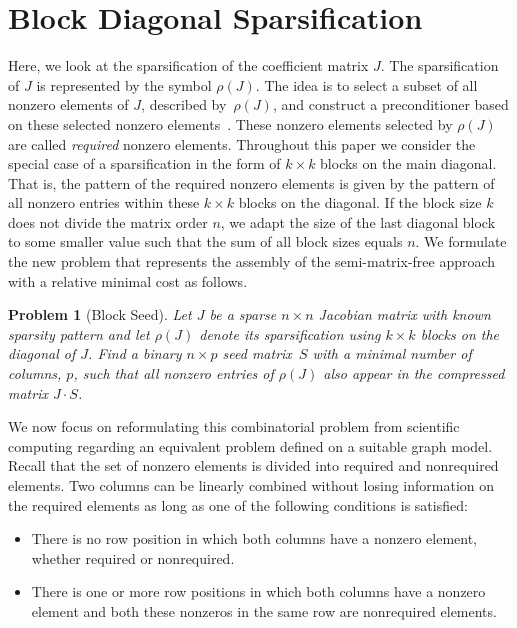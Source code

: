 \documentclass[11pt, twoside,a4paper]{book}
\newtheorem{problem}{Problem}
\newcommand{\sparsifysymbol}{\ensuremath{\rho}}
\newcommand{\sparsify}[1]{\ensuremath{\sparsifysymbol(#1)}}
\begin{document}
\section{Block Diagonal Sparsification}
\label{s.block.diag.sp}
Here, we look at the sparsification of the coefficient matrix $J$. The
sparsification of $J$ is represented by the symbol \sparsify{J}. The idea is to select a
subset of all nonzero elements of $J$, described by~\sparsify{J}, and construct a
preconditioner based on these selected nonzero elements~\cite{Cullum2006}. These nonzero
elements selected by \sparsify{J} are called \emph{required} nonzero elements. Throughout
this paper we consider the special case of a sparsification in the form of $k\times k$
blocks on the main diagonal. That is, the pattern of the required nonzero elements is
given by the pattern of all nonzero entries within these $k\times k$ blocks on the
diagonal. If the block size $k$ does not divide the matrix order $n$, we adapt the size
of the last diagonal block to some smaller value such that the sum of all block sizes
equals $n$. We formulate the new problem that represents the assembly of the
semi-matrix-free approach with a relative minimal cost as follows.
%
\begin{problem}[Block Seed]
\label{p:block}
%
Let $J$ be a sparse $n \times n$ Jacobian matrix with known sparsity pattern and let
\sparsify{J} denote its sparsification using $k \times k$ blocks on the diagonal of $J$.
Find a binary $n \times p$ seed matrix~$S$ with a minimal number of columns, $p$, such
that all nonzero entries of \sparsify{J} also appear in the compressed matrix $J \cdot
S$.
\end{problem}

We now focus on reformulating this combinatorial problem from
scientific computing regarding an equivalent problem defined on a suitable graph model.
Recall that the set of nonzero elements is divided into required and nonrequired
elements. Two columns can be linearly combined without losing information on the
required elements as long as one of the following conditions is satisfied:
\begin{itemize}
\item There is no row position in which both columns have a nonzero element, whether
required or nonrequired.
\item There is one or more row positions in which both columns have a nonzero element
and both these nonzeros in the same row are nonrequired elements.
\end{itemize}
\end{document}

